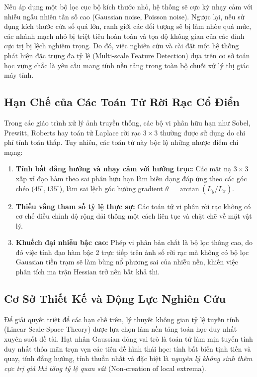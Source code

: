\documentclass[conference]{IEEEtran}
\begin{document}
Nếu áp dụng một bộ lọc cục bộ kích thước nhỏ, hệ thống sẽ cực kỳ nhạy cảm với nhiễu ngẫu nhiên tần số cao (Gaussian noise, Poisson noise). Ngược lại, nếu sử dụng kích thước cửa sổ quá lớn, ranh giới các đối tượng sẽ bị làm nhòe quá mức, các nhánh mạch nhỏ bị triệt tiêu hoàn toàn và tọa độ không gian của các đỉnh cực trị bị lệch nghiêm trọng. Do đó, việc nghiên cứu và cài đặt một hệ thống phát hiện đặc trưng đa tỷ lệ (Multi-scale Feature Detection) dựa trên cơ sở toán học vững chắc là yêu cầu mang tính nền tảng trong toàn bộ chuỗi xử lý thị giác máy tính.

\subsection{Hạn Chế của Các Toán Tử Rời Rạc Cổ Điển}
Trong các giáo trình xử lý ảnh truyền thống, các bộ vi phân hữu hạn như Sobel, Prewitt, Roberts hay toán tử Laplace rời rạc $3 \times 3$ thường được sử dụng do chi phí tính toán thấp. Tuy nhiên, các toán tử này bộc lộ những nhược điểm chí mạng:
\begin{enumerate}
    \item \textbf{Tính bất đẳng hướng và nhạy cảm với hướng trục:} Các mặt nạ $3 \times 3$ xấp xỉ đạo hàm theo sai phân hữu hạn làm biến dạng đáp ứng theo các góc chéo ($45^\circ, 135^\circ$), làm sai lệch góc hướng gradient $\theta = \arctan(L_y / L_x)$.
    \item \textbf{Thiếu vắng tham số tỷ lệ thực sự:} Các toán tử vi phân rời rạc không có cơ chế điều chỉnh độ rộng dải thông một cách liên tục và chặt chẽ về mặt vật lý.
    \item \textbf{Khuếch đại nhiễu bậc cao:} Phép vi phân bản chất là bộ lọc thông cao, do đó việc tính đạo hàm bậc 2 trực tiếp trên ảnh số rời rạc mà không có bộ lọc Gaussian tiền trạm sẽ làm bùng nổ phương sai của nhiễu nền, khiến việc phân tích ma trận Hessian trở nên bất khả thi.
\end{enumerate}

\subsection{Cơ Sở Thiết Kế và Động Lực Nghiên Cứu}
Để giải quyết triệt để các hạn chế trên, lý thuyết không gian tỷ lệ tuyến tính (Linear Scale-Space Theory) được lựa chọn làm nền tảng toán học duy nhất xuyên suốt đề tài. Hạt nhân Gaussian đóng vai trò là toán tử làm mịn tuyến tính duy nhất thỏa mãn trọn vẹn các tiên đề hình thái học: tính bất biến tịnh tiến và quay, tính đẳng hướng, tính thuần nhất và đặc biệt là \textit{nguyên lý không sinh thêm cực trị giả khi tăng tỷ lệ quan sát} (Non-creation of local extrema).
\end{document}

